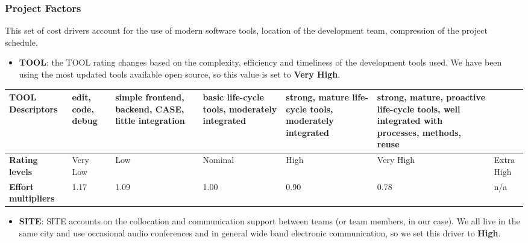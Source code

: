 		
		
		
	\subsubsection*{Project Factors}
	This set of cost drivers account for the use of modern software tools, location of the development team, compression of the project schedule. 
	
		\begin{itemize}
			\item \textbf{TOOL}: the TOOL rating changes based on the complexity, efficiency and timeliness of the development tools used. We have been using the most updated tools available open source, so this value is set to \textbf{Very High}.
		\end{itemize}
		
		\begin{center}
			\begin{tabular}{ | C{2cm} | C{2cm} | C{2cm} | C{2cm} | C{2cm} | C{2cm} | C{2cm} | }
				\hline
				\textbf{TOOL Descriptors} & edit, code, debug & simple frontend, backend, CASE, little integration & basic life-cycle tools, moderately integrated & strong, mature life-cycle tools, moderately integrated & strong, mature, proactive life-cycle tools, well integrated with processes, methods, reuse & \\ \hline
			
				\textbf{Rating levels} & Very Low & Low & Nominal & High & Very High & Extra High\\ \hline
			
				\textbf{Effort multipliers} & 1.17 & 1.09 & 1.00 & 0.90 & 0.78 & n/a\\ \hline
			\end{tabular}
		\end{center}
		
		
		
		\begin{itemize}
			\item \textbf{SITE}: SITE accounts on the collocation and communication support between teams (or team members, in our case). We all live in the same city and use occasional audio conferences and in general wide band electronic communication, so we set this driver to \textbf{High}.
		\end{itemize}
		
